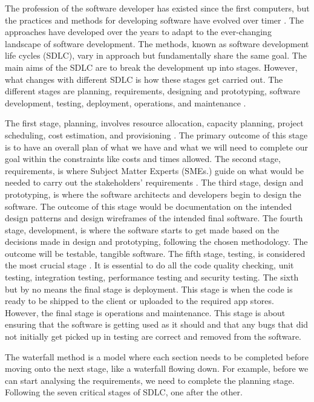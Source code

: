 The profession of the software developer has existed since the first computers, but the practices and methods for developing software have evolved over timer \cite{SDLC}. The approaches have developed over the years to adapt to the ever-changing landscape of software development. The methods, known as software development life cycles (SDLC), vary in approach but fundamentally share the same goal. The main aims of the SDLC are to break the development up into stages. However, what changes with different SDLC is how these stages get carried out. The different stages are planning, requirements, designing and prototyping, software development, testing, deployment, operations, and maintenance \cite{SDLC}.

The first stage, planning, involves resource allocation, capacity planning, project scheduling, cost estimation, and provisioning \cite{SDLC}. The primary outcome of this stage is to have an overall plan of what we have and what we will need to complete our goal within the constraints like costs and times allowed. The second stage, requirements, is where Subject Matter Experts (SMEs.) guide on what would be needed to carry out the stakeholders' requirements \cite{SDLC}. The third stage, design and prototyping, is where the software architects and developers begin to design the software. The outcome of this stage would be documentation on the intended design patterns and design wireframes of the intended final software. The fourth stage, development, is where the software starts to get made based on the decisions made in design and prototyping, following the chosen methodology. The outcome will be testable, tangible software. The fifth stage, testing, is considered the most crucial stage \cite{SDLC}. It is essential to do all the code quality checking, unit testing, integration testing, performance testing and security testing. The sixth but by no means the final stage is deployment. This stage is when the code is ready to be shipped to the client or uploaded to the required app stores. However, the final stage is operations and maintenance. This stage is about ensuring that the software is getting used as it should and that any bugs that did not initially get picked up in testing are correct and removed from the software. 

The waterfall method is a model where each section needs to be completed before moving onto the next stage, like a waterfall flowing down. For example, before we can start analysing the requirements, we need to complete the planning stage. Following the seven critical stages of SDLC, one after the other.

